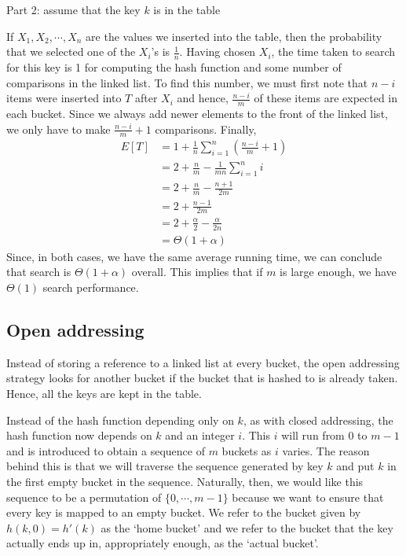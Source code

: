 \documentclass[11pt]{article}
\begin{document}
Part 2: assume that the key $k$ is in the table 

If $X_1, X_2, \cdots, X_n$ are the values we inserted into the table, then the probability that we selected one of the $X_i$'s is $\frac{1}{n}$. Having chosen $X_i$, the time taken to search for this key is 1 for computing the hash function and some number of comparisons in the linked list. To find this number, we must first note that $n-i$ items were inserted into $T$ after $X_i$ and hence, $\frac{n-i}{m}$ of these items are expected in each bucket. Since we always add newer elements to the front of the linked list, we only have to make $\frac{n-i}{m}+1$ comparisons. Finally, 
\begin{align*}
    E[T] &= 1 + \frac{1}{n}\sum_{i=1}^n (\frac{n-i}{m}+1) \\
    &= 2 + \frac{n}{m} - \frac{1}{mn}\sum_{i=1}^n i \\
    &= 2 + \frac{n}{m} - \frac{n+1}{2m} \\
    &= 2 + \frac{n-1}{2m} \\
    &= 2 + \frac{\alpha}{2} - \frac{\alpha}{2n} \\
    &= \Theta(1+\alpha)
\end{align*}
Since, in both cases, we have the same average running time, we can conclude that search is $\Theta(1+\alpha)$ overall. This implies that if $m$ is large enough, we have $\Theta(1)$ search performance. 

\subsection{Open addressing}
Instead of storing a reference to a linked list at every bucket, the open addressing strategy looks for another bucket if the bucket that is hashed to is already taken. Hence, all the keys are kept in the table. 

Instead of the hash function depending only on $k$, as with closed addressing, the hash function now depends on $k$ and an integer $i$. This $i$ will run from $0$ to $m-1$ and is introduced to obtain a sequence of $m$ buckets as $i$ varies. 
The reason behind this is that we will traverse the sequence generated by key $k$ and put $k$ in the first empty bucket in the sequence. Naturally, then, we would like this sequence to be a permutation of $\{0, \cdots, m-1\}$ because we want to ensure that every key is mapped to an empty bucket. We refer to the bucket given by $h(k,0) = h'(k)$ as the `home bucket' and we refer to the bucket that the key actually ends up in, appropriately enough, as the `actual bucket'. 
\end{document}
